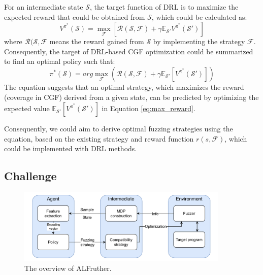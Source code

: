 \documentclass[lettersize,journal]{IEEEtran}
\begin{document}
For an intermediate state $\mathcal{S}$, the target function of DRL is to maximize the expected reward that could be obtained from $\mathcal{S}$, which could be calculated as:
\begin{equation}
	V^{\pi^*}(\mathcal{S}) = \max_{\mathcal{F}}\left[\mathcal{R}(\mathcal{S}, \mathcal{F}) + \gamma \mathbb{E}_{\mathcal{S}'}V^{\pi^*}(\mathcal{S}')\right]
\end{equation}
where $\mathcal{R}(\mathcal{S}, \mathcal{F}$ means the reward gained from $\mathcal{S}$ by implementing the strategy $\mathcal{F}$. Consequently, the target of DRL-based CGF optimization could be summarized to find an optimal policy such that:
\begin{equation}
	\pi^*(\mathcal{S}) = \textit{arg} \max_{\mathcal{F}}\left(\mathcal{R}(\mathcal{S}, \mathcal{F}) + \gamma\mathbb{E}_{\mathcal{S}'}\left[V^{\pi^*}(\mathcal{S}')\right]\right)
	\label{eq:max_reward}
\end{equation}
The equation suggests that an optimal strategy, which maximizes the reward (coverage in CGF) derived from a given state, can be predicted by optimizing the expected value $\mathbb{E}_{\mathcal{S}'}\left[V^{\pi^*}(\mathcal{S}')\right]$ in Equation \ref{eq:max_reward}.

Consequently, we could aim to derive optimal fuzzing strategies using the equation, based on the existing strategy and reward function $r(s, \mathcal{F})$, which could be implemented with DRL methods.


\subsection{Challenge}\label{subsec:challenge}

\begin{figure}[t!]
	\centerline{\includegraphics[width=0.9\textwidth]{fig/simplified_overview.pdf}}
	\caption{The overview of ALFruther.}
	\label{fig:overview}
\end{figure}
\end{document}
